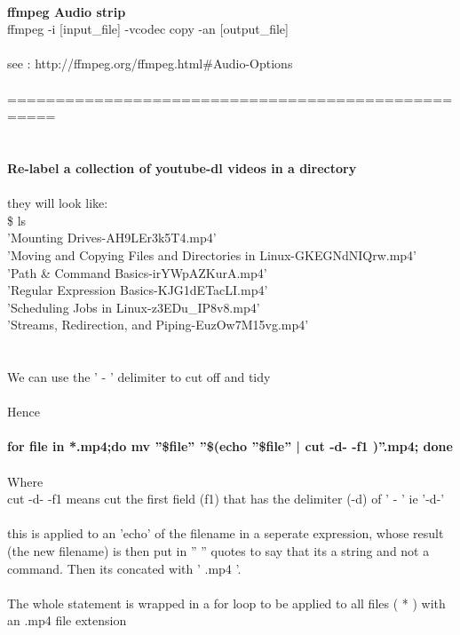 \documentclass[10pt,a4paper]{article}
\begin{document}
{{{{{{{{{{{{{{\\
\textbf{ffmpeg Audio strip}}{\large \\
ffmpeg -i [input\_file] -vcodec copy -an [output\_file]}{\Large \\
\\
see : http://ffmpeg.org/ffmpeg.html\#Audio-Options}{\Large \\
\\
===================================================\\
\\
\\
\textbf{Re-label a collection of youtube-dl videos in a directory}}{\Large \\
\\
they will look like:\\
\$ ls\\
'Mounting Drives-AH9LEr3k5T4.mp4'\\
'Moving and Copying Files and Directories in Linux-GKEGNdNIQrw.mp4'\\
'Path \& Command Basics-irYWpAZKurA.mp4'\\
'Regular Expression Basics-KJG1dETacLI.mp4'\\
'Scheduling Jobs in Linux-z3EDu\_IP8v8.mp4'\\
'Streams, Redirection, and Piping-EuzOw7M15vg.mp4'\\
\\
\\
We can use the ' - ' delimiter to cut off and tidy\\
\\
Hence\\
\\
		\textbf{for file in *.mp4;do mv ''\$file'' ''\$(echo ''\$file'' | cut -d- -f1 )''.mp4; done}}{\Large \\
\\
Where \\
cut -d- -f1     means cut the first field (f1) that has the delimiter (-d) of ' - ' ie  '-d-'\\
\\
this is applied to an 'echo' of the filename in a seperate expression, whose result (the new filename) is then put in '' '' quotes to say that its a string and not a command. Then its concated with ' .mp4 '.\\
\\
The whole statement is wrapped in a for loop to be applied to all files ( * ) with an .mp4 file extension\\
\\
}}}}}}}}}}}}}}
\end{document}

